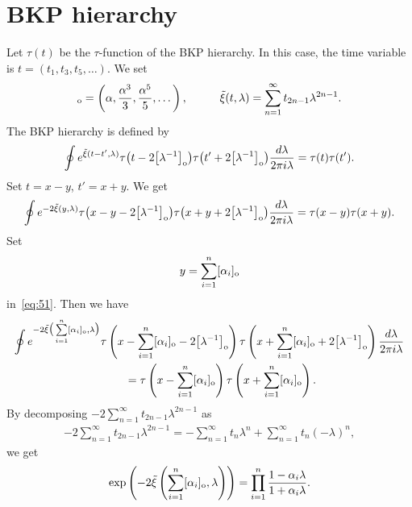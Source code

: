 \documentclass[pdftex]{sigma}
\begin{document}
\section{BKP hierarchy}\label{section4}

Let $\tau(t)$ be the $\tau$-function of the BKP hierarchy.
In this case, the time variable is $t=(t_1,t_3,t_5,\dots)$.
We set
\begin{gather*}
[\alpha]_{\rm o}=\left(\alpha,\frac{\alpha^3}{3},\frac{\alpha^5}{5},\dots\right),\hskip1cm\tilde{\xi}
(t,\lambda)=\sum_{n=1}^{\infty}t_{2n-1}\lambda^{2n-1}.
\end{gather*}
The BKP hierarchy \cite{DJKM1,JM1} is def\/ined by
\begin{gather}
\oint e^{\tilde{\xi}(t-t',\lambda)}\tau\big(t-2\big[\lambda^{-1}\big]_{\rm o}\big)\tau\big(t'+2\big[\lambda^{-1}\big]_{\rm o}\big)\frac{d\lambda}
{2\pi i\lambda}=\tau(t)\tau(t').
\label{eq:50}
\end{gather}
Set $t=x-y$, $t'=x+y$.
We get
\begin{gather}
\oint e^{-2\tilde{\xi}(y,\lambda)}\tau\big(x-y-2\big[\lambda^{-1}\big]_{\rm o}\big)\tau\big(x+y+2\big[\lambda^{-1}\big]_{\rm o}\big)\frac{d\lambda}
{2\pi i\lambda}=\tau(x-y)\tau(x+y).
\label{eq:51}
\end{gather}
Set
\begin{gather*}
y=\sum_{i=1}^{n} [\alpha_i]_{\rm o}
\end{gather*}
in~\eqref{eq:51}. Then we have
\begin{gather*}%
\oint e^{-2\tilde{\xi}\big(\sum\limits_{i=1}^{n} [\alpha_i]_{\rm o},\lambda\big)}\tau\left(x-\sum_{i=1}^{n}
 [\alpha_i]_{\rm o}-2\big[\lambda^{-1}\big]_{\rm o}\right)
\tau\left(x+\sum_{i=1}^{n} [\alpha_i]_{\rm o}+2\big[\lambda^{-1}\big]_{\rm o}\right)\frac{d\lambda}{2\pi i\lambda}
\\
\qquad
{}=\tau\left(x-\sum_{i=1}^{n} [\alpha_i]_{\rm o}\right)\tau\left(x+\sum_{i=1}^{n} [\alpha_i]_{\rm o}\right).
\end{gather*}
By decomposing $-2\sum\limits_{n=1}^\infty t_{2n-1}{\lambda}^{2n-1}$ as
\begin{gather*}
-2\sum_{n=1}^\infty t_{2n-1}{\lambda}^{2n-1}=-\sum_{n=1}^{\infty}t_n{\lambda}^n+\sum_{n=1}^{\infty}
t_n(-\lambda)^n,
\end{gather*}
we get
\begin{gather*}
\exp\left(-2\tilde{\xi}\left(\sum_{i=1}^{n} [\alpha_i]_{\rm o},\lambda\right)\right)=\prod_{i=1}^{n}
\frac{1-\alpha_i\lambda}{1+\alpha_i\lambda}.
\end{gather*}
\end{document}
